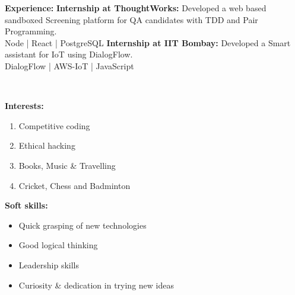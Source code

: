 \documentclass[a4paper,11pt]{article}
\begin{document}
\begin{center}
\begin{minipage}[t]{0.35\textwidth}
            \begin{LARGE}
				\textbf{Experience:}\medskip%
				{\small
					\vspace{0.2cm}
					\newline
					\textbf{Internship at ThoughtWorks:}
					\newline
					Developed a web based sandboxed Screening platform for QA candidates with TDD and Pair Programming.
					\medskip
					\\Node | React | PostgreSQL
				}\medskip%
				{\small
					\vspace{0.2cm}
					\newline
					\textbf{Internship at IIT Bombay:}
					\newline
					Developed a Smart assistant for IoT using DialogFlow.
					\medskip
					\\DialogFlow | AWS-IoT | JavaScript
				}
			\end{LARGE}
			\\\vspace{0.7cm}
            \begin{LARGE}
				\textbf{Interests:}\smallskip%
				{\small
					\begin{enumerate}[leftmargin=*,label=-]
						\item Competitive coding
						\item Ethical hacking
						\item Books, Music \& Travelling
						\item Cricket, Chess and Badminton
					\end{enumerate}
				}
			\end{LARGE}
			\vspace{0.55cm}
			\begin{LARGE}
				\textbf{Soft skills:}\smallskip%
				{\small
					\begin{itemize}[leftmargin=*]
						\item Quick grasping of new technologies
						\item Good logical thinking
						\item Leadership skills
						\item Curiosity \& dedication in trying new ideas
					\end{itemize}
				}
			\end{LARGE}
		\end{minipage}%
		\hspace{0.6cm}
		\begin{minipage}[t]{0.6\textwidth}
			\raggedright\smallskip
			\begin{LARGE}

\end{LARGE}
\end{minipage}
\end{center}
\end{document}
